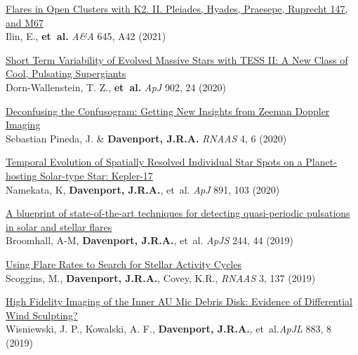 \documentclass{article}
\begin{document}
\begin{llist}
\begin{etaremune}[leftmargin=10pt]
\item{\sc \href{https://arxiv.org/abs/2010.05576}{\color{NavyBlue} Flares in Open Clusters with K2. II. Pleiades, Hyades, Praesepe, Ruprecht 147, and M67}}\\
Ilin, E., {\bf et~al.} {\em A\&A} 645, A42 (2021)


\item{\sc \href{https://arxiv.org/abs/2008.11723}{\color{NavyBlue} Short Term Variability of Evolved Massive Stars with TESS II: A New Class of Cool, Pulsating Supergiants }}\\
Dorn-Wallenstein, T. Z., {\bf et~al.} {\em ApJ} 902, 24 (2020)

\item{\sc \href{https://iopscience.iop.org/article/10.3847/2515-5172/ab98f4}{\color{NavyBlue} Deconfusing the Confusogram: Getting New Insights from Zeeman Doppler Imaging}}\\
Sebastian Pineda, J. \& {\bf Davenport,  J.R.A.} {\em RNAAS} 4, 6 (2020)

\item{\sc \href{https://ui.adsabs.harvard.edu/abs/2020ApJ...891..103N}{\color{NavyBlue} Temporal Evolution of Spatially Resolved Individual Star Spots on a Planet-hosting Solar-type Star: Kepler-17}}\\
Namekata, K, {\bf Davenport,  J.R.A.}, et~al. {\em ApJ} 891, 103 (2020)


\item{\sc \href{https://arxiv.org/abs/1910.08458}{\color{NavyBlue} A blueprint of state-of-the-art techniques for detecting quasi-periodic pulsations in solar and stellar flares}}\\
Broomhall, A-M, {\bf Davenport,  J.R.A.}, et~al. {\em ApJS} 244, 44 (2019)

\item{\sc \href{https://doi.org/10.3847/2515-5172/ab45a0}{\color{NavyBlue}Using Flare Rates to Search for Stellar Activity Cycles}}\\
Scoggins, M., {\bf Davenport, J.R.A.}, Covey, K.R., {\em RNAAS} 3, 137 (2019)


\item{\sc\href{http://arxiv.org/abs/1907.10113}{\color{NavyBlue}High Fidelity Imaging of the Inner AU Mic Debris Disk: Evidence of Differential Wind Sculpting?}}\\
Wisniewski, J. P., Kowalski, A. F., {\bf Davenport,  J.R.A.}, et~al.{\em ApJL} 883, 8 (2019)


\end{etaremune}
\end{llist}
\end{document}
